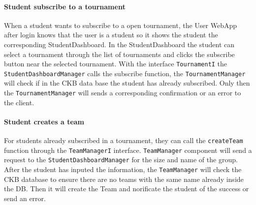 \paragraph{Student subscribe to a tournament}
When a student wants to subscribe to a open tournament, the User WebApp after login knows that the user is a student so it shows the student the corresponding StudentDashboard.
In the StudentDashboard the student can select a tournament through the list of tournaments and clicks the subscribe button near the selected tournament.
With the interface \verb|TournamentI| the \verb|StudentDashboardManager| calls the subscribe function, the \verb|TournamentManager| will check if in the CKB data base the student has already subscribed.
Only then the \verb|TournamentManager| will sends a corresponding confirmation or an error to the client.

\paragraph{Student creates a team}
For students already subscribed in a tournament, they can call the \verb|createTeam| function through the \verb|TeamManagerI| interface.
\verb|TeamManager| component will send a request to the \verb|StudentDashboardManager| for the size and name of the group. After the student has inputed the information, the \verb|TeamManager|
will check the CKB database to ensure there are no teams with the same name already inside the DB. Then it will create the Team and norificate the student of the success or send an error.


